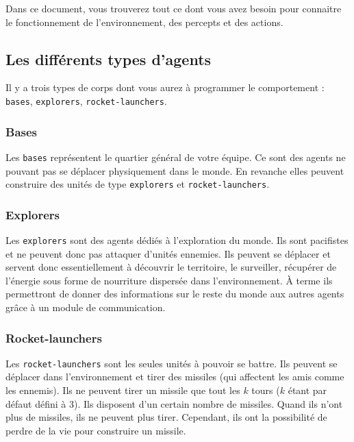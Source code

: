 \documentclass[a4paper,11pt]{article}
\begin{document}
Dans ce document, vous trouverez tout ce dont vous avez besoin pour connaitre le fonctionnement de
l'environnement, des percepts et des actions.

\subsection*{Les différents types d'agents}

Il y a trois types de corps dont vous aurez à programmer le comportement : \texttt{bases},
\texttt{explorers}, \texttt{rocket-launchers}.

\subsubsection*{Bases}
Les \texttt{bases} représentent le quartier général de votre équipe. Ce sont des agents ne pouvant
pas se déplacer physiquement dans le monde. En revanche elles peuvent construire des unités de type
\texttt{explorers} et \texttt{rocket-launchers}.

\subsubsection*{Explorers}
Les \texttt{explorers} sont des agents dédiés à l'exploration du monde. Ils sont pacifistes et ne
peuvent donc pas attaquer d'unités ennemies. Ils peuvent se déplacer et servent donc essentiellement
à découvrir le territoire, le surveiller, récupérer de l'énergie sous forme de nourriture dispersée
dans l'environnement. À terme ils permettront de donner des informations sur le reste du monde aux
autres agents grâce à un module de communication.

\subsubsection*{Rocket-launchers}
Les \texttt{rocket-launchers} sont les seules unités à pouvoir se battre. Ils peuvent se déplacer
dans l'environnement et tirer des missiles (qui affectent les amis comme les ennemis). Ils ne
peuvent tirer un missile que tout les $k$ tours ($k$ étant par défaut défini à 3). Ils disposent
d'un certain nombre de missiles. Quand ils n'ont plus de missiles, ils ne peuvent plus tirer.
Cependant, ils ont la possibilité de perdre de la vie pour construire un missile.



\end{document}
